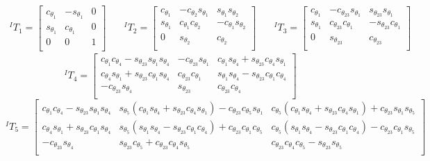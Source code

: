 \documentclass[12pt]{report}
\begin{document}
\[
\begin{aligned}
  ^IT_1 =
  \begin{bmatrix}
    c_{\theta_1}& -s_{\theta_1}& 0\\
    s_{\theta_1}&  c_{\theta_1}& 0\\
    0&            0& 1\\
  \end{bmatrix} & \quad
  ^IT_2 =
  \begin{bmatrix}
    c_{\theta_1}& -c_{\theta_2}s_{\theta_1}&  s_{\theta_1}s_{\theta_2}\\
    s_{\theta_1}&  c_{\theta_1}c_{\theta_2}& -c_{\theta_1}s_{\theta_2}\\
    0&              s_{\theta_2}&              c_{\theta_2}\\
  \end{bmatrix} & \quad
  ^IT_3 =
  \begin{bmatrix}
    c_{\theta_1}& -c_{\theta_{23}}s_{\theta_1}&  s_{\theta_{23}}s_{\theta_1}\\
    s_{\theta_1}&  c_{\theta_{23}}c_{\theta_1}& -s_{\theta_{23}}c_{\theta_1}\\
    0&              s_{\theta_{23}}&              c_{\theta_{23}}\\
  \end{bmatrix}
\end{aligned}
\]
\[
^IT_4 =
\begin{bmatrix}
c_{\theta_1}c_{\theta_4} - s_{\theta_{23}}s_{\theta_1}s_{\theta_4}& -c_{\theta_{23}}s_{\theta_1}& c_{\theta_1}s_{\theta_4} + s_{\theta_{23}}c_{\theta_4}s_{\theta_1}\\
c_{\theta_4}s_{\theta_1} + s_{\theta_{23}}c_{\theta_1}s_{\theta_4}&  c_{\theta_{23}}c_{\theta_1}& s_{\theta_1}s_{\theta_4} - s_{\theta_{23}}c_{\theta_1}c_{\theta_4}\\
-c_{\theta_{23}}s_{\theta_4}&              s_{\theta_{23}}&                                       c_{\theta_{23}}c_{\theta_4}\\
\end{bmatrix}
\]
\[
^IT_5 =
\begin{bmatrix}
c_{\theta_1}c_{\theta_4} - s_{\theta_{23}}s_{\theta_1}s_{\theta_4}& s_{\theta_5}(c_{\theta_1}s_{\theta_4} + s_{\theta_{23}}c_{\theta_4}s_{\theta_1}) - c_{\theta_{23}}c_{\theta_5}s_{\theta_1}& c_{\theta_5}(c_{\theta_1}s_{\theta_4} +
 s_{\theta_{23}}c_{\theta_4}s_{\theta_1}) + c_{\theta_{23}}s_{\theta_1}s_{\theta_5}\\
c_{\theta_4}s_{\theta_1} + s_{\theta_{23}}c_{\theta_1}s_{\theta_4}& s_{\theta_5}(s_{\theta_1}s_{\theta_4} - s_{\theta_{23}}c_{\theta_1}c_{\theta_4}) + c_{\theta_{23}}c_{\theta_1}c_{\theta_5}& c_{\theta_5}(s_{\theta_1}s_{\theta_4} - s_{\theta_{23}}c_{\theta_1}c_{\theta_4}) - c_{\theta_{23}}c_{\theta_1}s_{\theta_5}\\
-c_{\theta_{23}}s_{\theta_4}&                                                     s_{\theta_{23}}c_{\theta_5} + c_{\theta_{23}}c_{\theta_4}s_{\theta_5}&                                                     c_{\theta_{23}}c_{\theta_4}c_{\theta_5} - s_{\theta_{23}}s_{\theta_5}\\
\end{bmatrix}
\]
\end{document}
